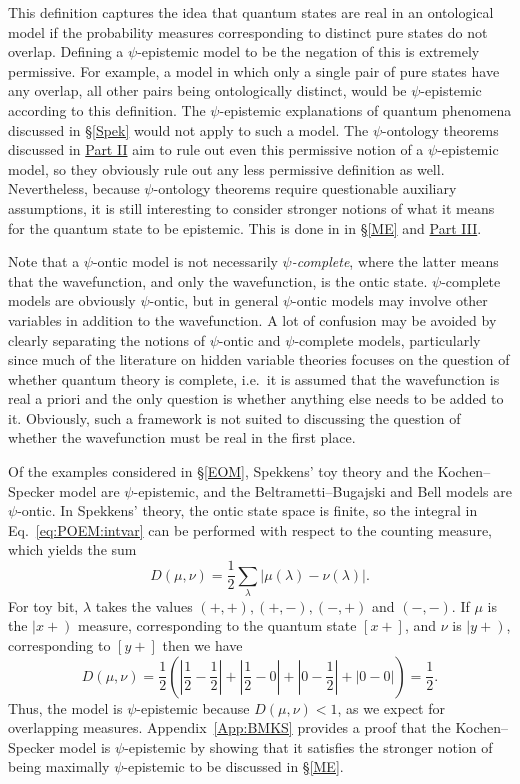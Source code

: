 \documentclass[DIV=calc,fontsize=12pt]{scrartcl} %
\theoremstyle{definition}
\theoremstyle{plain}
\newcommand{\RKet}[1]{\ensuremath{\left \vert #1 \right )}}
\newcommand{\Proj}[1]{\ensuremath{\left [ #1 \right ]}}
\begin{document}
This definition captures the idea that quantum states are real in an
ontological model if the probability measures corresponding to
distinct pure states do not overlap.  Defining a $\psi$-epistemic
model to be the negation of this is extremely permissive.  For
example, a model in which only a single pair of pure states have any
overlap, all other pairs being ontologically distinct, would be
$\psi$-epistemic according to this definition.  The $\psi$-epistemic
explanations of quantum phenomena discussed in \S\ref{Spek} would not
apply to such a model.  The $\psi$-ontology theorems discussed in
\hyperref[SPON]{Part II} aim to rule out even this permissive notion of a
$\psi$-epistemic model, so they obviously rule out any less permissive
definition as well.  Nevertheless, because $\psi$-ontology theorems
require questionable auxiliary assumptions, it is still interesting to
consider stronger notions of what it means for the quantum state to be
epistemic.  This is done in in \S\ref{ME} and \hyperref[Beyond]{Part III}.

Note that a $\psi$-ontic model is not necessarily
\emph{$\psi$-complete}, where the latter means that the wavefunction,
and only the wavefunction, is the ontic state.  $\psi$-complete models
are obviously $\psi$-ontic, but in general $\psi$-ontic models may
involve other variables in addition to the wavefunction.  A lot of
confusion may be avoided by clearly separating the notions of
$\psi$-ontic and $\psi$-complete models, particularly since much of
the literature on hidden variable theories focuses on the question of
whether quantum theory is complete, i.e.\ it is assumed that the
wavefunction is real a priori and the only question is whether
anything else needs to be added to it.  Obviously, such a framework is
not suited to discussing the question of whether the wavefunction must
be real in the first place.

Of the examples considered in \S\ref{EOM}, Spekkens' toy theory and
the Kochen--Specker model are $\psi$-epistemic, and the
Beltrametti--Bugajski and Bell models are $\psi$-ontic.  In Spekkens'
theory, the ontic state space is finite, so the integral in
Eq.~\eqref{eq:POEM:intvar} can be performed with respect to the
counting measure, which yields the sum
\begin{equation}
D(\mu,\nu) = \frac{1}{2} \sum_{\lambda} |\mu(\lambda) - \nu(\lambda)
|.
\end{equation}
For toy bit, $\lambda$ takes the values $(+,+), (+,-), (-,+)$ and
$(-,-)$.  If $\mu$ is the $\RKet{x+}$ measure, corresponding to the
quantum state $\Proj{x+}$, and $\nu$ is $\RKet{y+}$, corresponding to
$\Proj{y+}$ then we have
\begin{equation}
D(\mu,\nu) = \frac{1}{2} \left ( \left | \frac{1}{2}-\frac{1}{2}
\right | + \left | \frac{1}{2}-0 \right | +
\left | 0-\frac{1}{2} \right | + \left | 0-0 \right | \right ) =
\frac{1}{2}.
\end{equation}
Thus, the model is $\psi$-epistemic because $D(\mu,\nu) < 1$, as we
expect for overlapping measures.  Appendix~\ref{App:BMKS} provides a
proof that the Kochen--Specker model is $\psi$-epistemic by showing
that it satisfies the stronger notion of being maximally
$\psi$-epistemic to be discussed in \S\ref{ME}.
\end{document}
